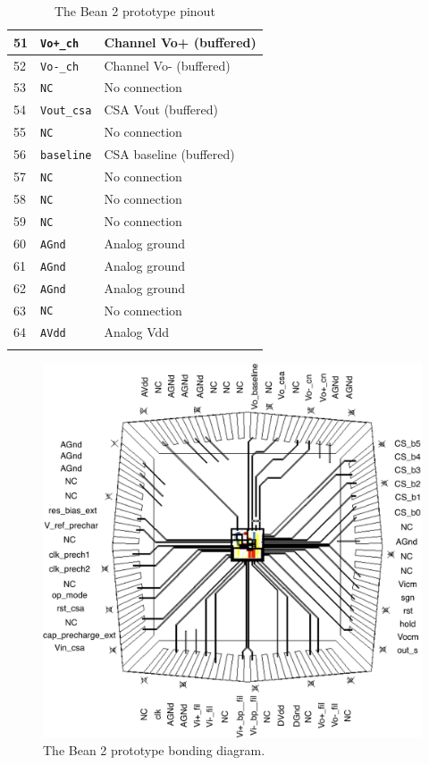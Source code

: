 \begin{center}
\begin{longtable}{|l|l|l|}
51 & \verb=Vo+_ch= & Channel Vo+ (buffered) \\\hline
52 & \verb=Vo-_ch= & Channel Vo- (buffered)\\\hline
53 & \verb=NC= & No connection \\\hline
54 & \verb=Vout_csa= & CSA Vout (buffered) \\\hline
55 & \verb=NC= & No connection \\\hline
56 & \verb=baseline= & CSA baseline (buffered) \\\hline
57 & \verb=NC= & No connection \\\hline
58 & \verb=NC= & No connection \\\hline
59 & \verb=NC= & No connection \\\hline
60 & \verb=AGnd= & Analog ground \\\hline
61 & \verb=AGnd= & Analog ground \\\hline
62 & \verb=AGnd= & Analog ground \\\hline
63 & \verb=NC= & No connection \\\hline
64 & \verb=AVdd= & Analog Vdd \\\hline
\caption{The Bean 2 prototype pinout}\label{tab:pinout}
\end{longtable}
\end{center}

\begin{figure}[!t]
	\centering
	\includegraphics[width=6in]{./Figures/bondpad.pdf}
	\caption{The Bean 2 prototype bonding diagram.}\label{fig:bondpad}
\end{figure}

